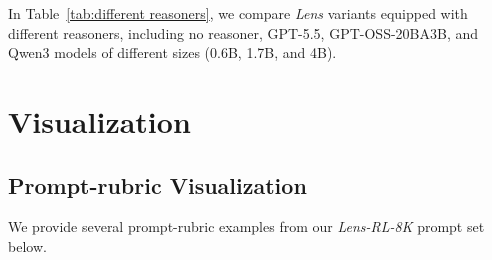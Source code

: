 \documentclass{llmxive}
\begin{document}
In Table~\ref{tab:different reasoners}, we compare \textit{Lens} variants equipped with different reasoners, including no reasoner, GPT-5.5, GPT-OSS-20BA3B, and Qwen3 models of different sizes (0.6B, 1.7B, and 4B).


\section{Visualization}
\label{sec:visualization-appendix}


\subsection{Prompt-rubric Visualization}
\label{vis:rubric}
We provide several prompt-rubric examples from our \textit{Lens-RL-8K} prompt set below.
\end{document}
